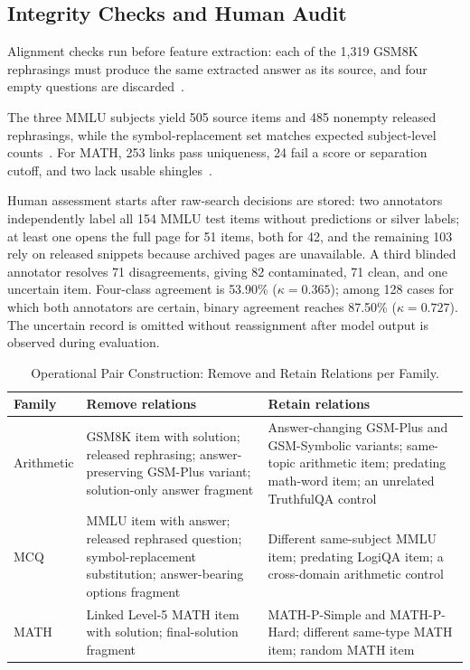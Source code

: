 \documentclass[conference]{IEEEtran}
\begin{document}
\subsection{Integrity Checks and Human Audit}
Alignment checks run before feature extraction: each of the 1,319 GSM8K rephrasings must produce the same extracted answer as its source, and four empty questions are discarded~\cite{yang2023}.

The three MMLU subjects yield 505 source items and 485 nonempty released rephrasings, while the symbol-replacement set matches expected subject-level counts~\cite{wang2024}. For MATH, 253 links pass uniqueness, 24 fail a score or separation cutoff, and two lack usable shingles~\cite{huang2025}.

Human assessment starts after raw-search decisions are stored: two annotators independently label all 154 MMLU test items without predictions or silver labels; at least one opens the full page for 51 items, both for 42, and the remaining 103 rely on released snippets because archived pages are unavailable. A third blinded annotator resolves 71 disagreements, giving 82 contaminated, 71 clean, and one uncertain item. Four-class agreement is 53.90\% ($\kappa=0.365$); among 128 cases for which both annotators are certain, binary agreement reaches 87.50\% ($\kappa=0.727$). The uncertain record is omitted without reassignment after model output is observed during evaluation.



\begin{table}[t]
\caption{Operational Pair Construction: Remove and Retain Relations per Family.}
\label{tab:relations}
\centering
\begin{tabular}{@{}p{}p{}p{}@{}}
\toprule
Family & Remove relations & Retain relations\\
\midrule
Arithmetic & GSM8K item with solution; released rephrasing; answer-preserving GSM-Plus variant; solution-only answer fragment & Answer-changing GSM-Plus and GSM-Symbolic variants; same-topic arithmetic item; predating math-word item; an unrelated TruthfulQA control\\
MCQ & MMLU item with answer; released rephrased question; symbol-replacement substitution; answer-bearing options fragment & Different same-subject MMLU item; predating LogiQA item; a cross-domain arithmetic control\\
MATH & Linked Level-5 MATH item with solution; final-solution fragment & MATH-P-Simple and MATH-P-Hard; different same-type MATH item; random MATH item\\
\bottomrule
\end{tabular}
\end{table}
\end{document}

